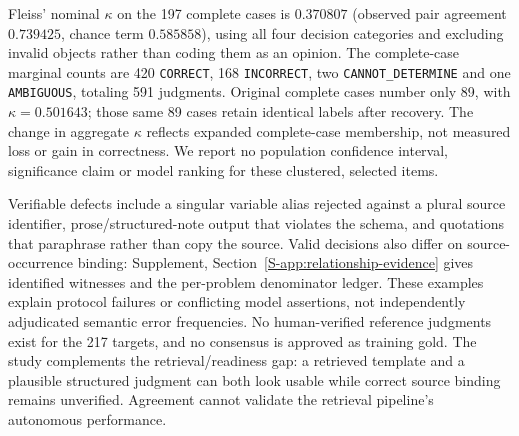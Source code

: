 Fleiss' nominal $\kappa$ on the 197 complete cases is $0.370807$ (observed pair agreement $0.739425$, chance term $0.585858$), using all four decision categories and excluding invalid objects rather than coding them as an opinion. The complete-case marginal counts are 420 \texttt{CORRECT}, 168 \texttt{INCORRECT}, two \texttt{CANNOT\_DETERMINE} and one \texttt{AMBIGUOUS}, totaling 591 judgments. Original complete cases number only 89, with $\kappa=0.501643$; those same 89 cases retain identical labels after recovery. The change in aggregate $\kappa$ reflects expanded complete-case membership, not measured loss or gain in correctness. We report no population confidence interval, significance claim or model ranking for these clustered, selected items.

Verifiable defects include a singular variable alias rejected against a plural source identifier, prose/structured-note output that violates the schema, and quotations that paraphrase rather than copy the source. Valid decisions also differ on source-occurrence binding: Supplement, Section~\ref{S-app:relationship-evidence} gives identified witnesses and the per-problem denominator ledger. These examples explain protocol failures or conflicting model assertions, not independently adjudicated semantic error frequencies. No human-verified reference judgments exist for the 217 targets, and no consensus is approved as training gold. The study complements the retrieval/readiness gap: a retrieved template and a plausible structured judgment can both look usable while correct source binding remains unverified. Agreement cannot validate the retrieval pipeline's autonomous performance.
